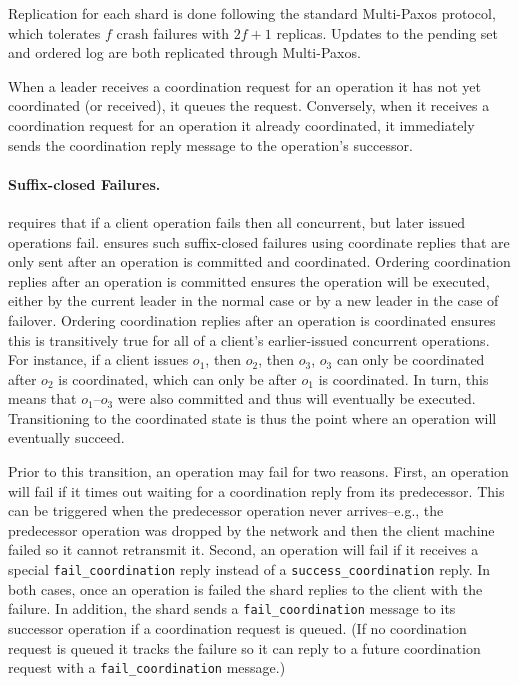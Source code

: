 
Replication for each shard is done following the standard Multi-Paxos protocol, which tolerates $f$ crash failures with $2f+1$ replicas.
Updates to the pending set and ordered log are both replicated through Multi-Paxos.

When a leader receives a coordination request for an operation it has not yet coordinated (or received), it queues the request.
Conversely, when it receives a coordination request for an operation it already coordinated, it immediately sends the coordination reply message to the operation's successor.


\paragraph{Suffix-closed Failures.}
\Mdl{} requires that if a client operation fails then all concurrent, but later issued operations fail.
\sys{} ensures such suffix-closed failures using coordinate replies that are only sent after an operation is committed and coordinated.
Ordering coordination replies after an operation is committed ensures the operation will be executed, either by the current leader in the normal case or by a new leader in the case of failover.
Ordering coordination replies after an operation is coordinated ensures this is transitively true for all of a client's earlier-issued concurrent operations.
For instance, if a client issues $o_1$, then $o_2$, then $o_3$, $o_3$ can only be coordinated after $o_2$ is coordinated, which can only be after $o_1$ is coordinated.
In turn, this means that $o_1$--$o_3$ were also committed and thus will eventually be executed.
Transitioning to the coordinated state is thus the point where an operation will eventually succeed.

Prior to this transition, an operation may fail for two reasons.
First, an operation will fail if it times out waiting for a coordination reply from its predecessor.
This can be triggered when the predecessor operation never arrives--e.g., the predecessor operation was dropped by the network and then the client machine failed so it cannot retransmit it.
Second, an operation will fail if it receives a special \texttt{fail\_coordination} reply instead of a \texttt{success\_coordination} reply.
In both cases, once an operation is failed the shard replies to the client with the failure.
In addition, the shard sends a \texttt{fail\_coordination} message to its successor operation if a coordination request is queued.
(If no coordination request is queued it tracks the failure so it can reply to a future coordination request with a \texttt{fail\_coordination} message.)


